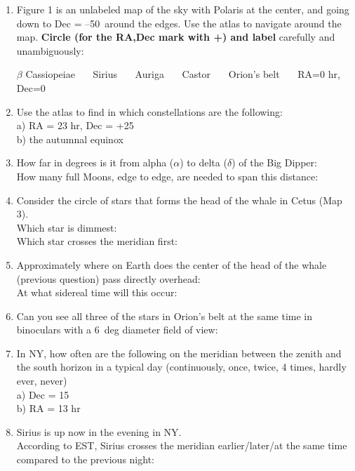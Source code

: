\documentclass[11pt]{article}
\begin{document}
\begin{enumerate}

\item 
Figure 1 is an unlabeled map of the sky with Polaris at the center, and
going down to Dec = --50\deg\ around the edges.  Use the atlas to
navigate around the map. {\bf Circle (for the RA,Dec mark with +) and label}
carefully and unambiguously: 

\medskip
$\beta$ Cassiopeiae \ \ \ Sirius \ \ \ Auriga \ \ \ Castor
\ \ \  Orion's belt \ \ \ RA=0 hr, Dec=0\deg

\vskip 1.0cm
\item
Use the atlas to find in which constellations are the following: \\
a) RA = 23 hr, Dec = +25\deg \\
b) the autumnal equinox

\vskip 1.0cm
\item 
How far in degrees is it from alpha ($\alpha$) to delta ($\delta$) of the
Big Dipper: \\
How many full Moons, edge to edge, are needed to span this distance:

\vskip 1.0cm
\item 
Consider the circle of stars that forms the head of the whale in Cetus
(Map 3).\\
Which star is dimmest:\\
Which star crosses the meridian first:

\vskip 1.0cm
\item
Approximately where on Earth does the center of the head of the whale (previous
question) pass
directly overhead: \\ 
At what sidereal time will this occur:

\vskip 1.0cm
\item
Can you see all three of the stars in Orion's belt
at the same time in binoculars with a 6~deg diameter field of view:

\vskip 1.0cm
\item
In NY, how often are the following on the meridian between the zenith
and the south horizon in a typical day (continuously, once, twice, 4 times, hardly ever, never) \\
a) Dec = 15\deg \\
b) RA = 13 hr 


\vskip 1.0cm
\item 
Sirius is up now in the evening in NY.  \\
According to EST, Sirius crosses the meridian earlier/later/at the
same time compared to the previous night:


\end{enumerate}
\end{document}
